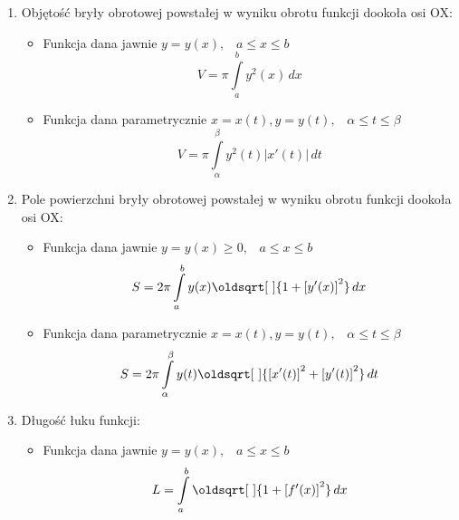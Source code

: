 \documentclass[10pt, twoside, fleqn]{article}
\renewcommand*{\sqrt}[2][\ ]{\oldsqrt[#1]{#2}}
\begin{document}
			\begin{enumerate}

				\item Objętość bryły obrotowej powstałej w wyniku obrotu 
					  funkcji dookoła osi OX:
					\begin{itemize}
						\item Funkcja dana jawnie 
							  $ y=y(x), \hspace{10pt} a \le x \le b $			
									\begin{equation*}
										V=\pi \int\limits_a^b{y^2(x)\,dx}
									\end{equation*}		
												
						\item Funkcja dana parametrycznie
							  $ x=x(t), y=y(t),\hspace{10pt} 
							  	\alpha \le t \le \beta $					
									\begin{equation*}
										V=\pi \int\limits_\alpha^\beta{y^2(t)
											| x'(t) | \,dt}
									\end{equation*}						
					\end{itemize}	
					
					
					
				\item Pole powierzchni bryły obrotowej powstałej w wyniku obrotu 
					  funkcji dookoła osi OX:
					\begin{itemize}
						\item Funkcja dana jawnie 
							  $ y=y(x) \ge 0, \hspace{10pt} a \le x \le b $			
									\begin{equation*}
										S = 2\pi \int\limits_a^b
											{y(x) \sqrt{1+\left[y'(x)\right]^2}\,dx}
									\end{equation*}		
												
						\item Funkcja dana parametrycznie
							  $ x=x(t), y=y(t), \hspace{10pt} 
							  	\alpha \le t \le \beta $					
									\begin{equation*}
										S = 2\pi \int\limits_\alpha^\beta
													{y(t) \sqrt{\left[x'(t)\right]^2 		
													+\left[y'(t)\right]^2} \,dt}
									\end{equation*}						
					\end{itemize}				
					
					
					
					
					
				\item Długość łuku funkcji:
					\begin{itemize}
						\item Funkcja dana jawnie 
							  $ y=y(x), \hspace{10pt} a \le x \le b $			
									\begin{equation*}
										L=\int\limits_a^b
											{\sqrt{1+\left[f'(x)\right]^2}
										  \,dx}
									\end{equation*}		
												

\end{itemize}
\end{enumerate}
\end{document}
